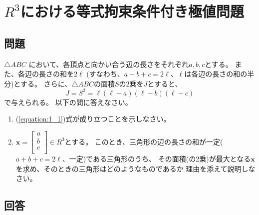 \section{\(R^{3}\)における等式拘束条件付き極値問題} \label{section:1}

\subsection{問題}

\(\bigtriangleup{ABC}\) において、各頂点と向かい合う辺の長さをそれぞれ\(a,b,c\)とする。
また、各辺の長さの和を\(2\ell\)
(すなわち、\(a + b + c = 2 \ell\)、\(\ell\)は各辺の長さの和の半分)とする。
さらに、\(\bigtriangleup{ABC}\)の面積\(S\)の\(2\)乗を\(J\)とすると、
\begin{equation}\label{equation:1_1}
  J = S^{2} = \ell \left(\ell - a\right) \left(\ell - b\right) \left(\ell - c\right)
\end{equation}
で与えられる。
以下の問に答えなさい。

\renewcommand{\labelenumi}{(\arabic{enumi})}
\begin{enumerate}
  \item (\ref{equation:1_1})式が成り立つことを示しなさい。
  \item \(\bm{x} = \begin{bmatrix}a\\b\\c\\ \end{bmatrix} \in R^{3}\)とする。
  このとき、三角形の辺の長さの和が一定(\(a + b + c = 2 \ell\)、一定)である三角形のうち、
  その面積(の2乗)が最大となる\(\bm{x}\)を求め、そのときの三角形はどのようなものであるか
  理由を添えて説明しなさい。
\end{enumerate}

\subsection{回答}

